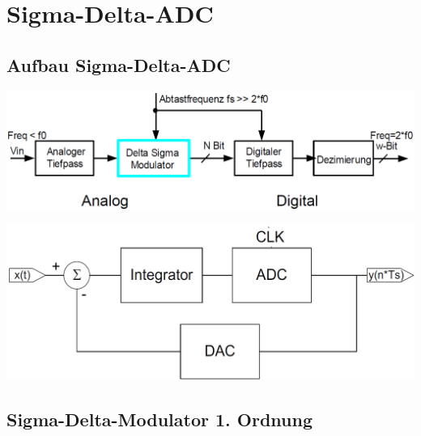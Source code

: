 
\section{Sigma-Delta-ADC}

\subsection{Aufbau Sigma-Delta-ADC}
\label{Aufbau Sigma-Delta-ADC}

\begin{minipage}[t]{0.6\columnwidth}
    \begin{center}
    \end{center}
    \includegraphics[width=\columnwidth]{images/aufbau_sigma_delta_ADC.png}
\end{minipage}
\hfill
\begin{minipage}[t]{0.38\columnwidth}
    \begin{center}
    \end{center}
    \includegraphics[width=\columnwidth]{images/aufbau_sigma_delta_modulator.png}
\end{minipage}


\subsection{Sigma-Delta-Modulator 1. Ordnung}
\label{Sigma-Delta-modulator Ordnung 1}

